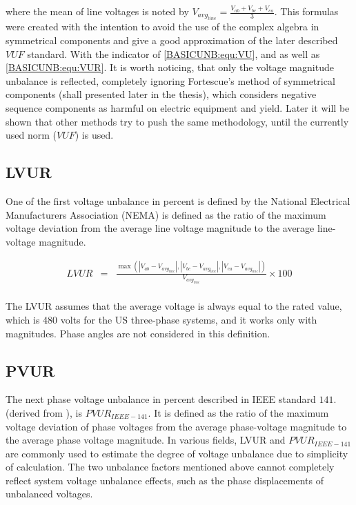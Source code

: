 		where the mean of line voltages is noted by $V_{avg_{line}}=\frac{V_{ab}+V_{bc}+V_{ca}}{3}$.
		This formulas were created with the intention to avoid the use of the complex algebra in symmetrical components and give
a good approximation of the later described $VUF$ standard. With the indicator of \ref{BASICUNB:equ:VU}, and as well as \ref{BASICUNB:equ:VUR}. It is worth noticing, that only the voltage magnitude unbalance is reflected, completely ignoring Fortescue's method of symmetrical components \cite{fortescue1918method} (shall presented later in the thesis), which considers negative sequence components as harmful on electric equipment and yield. Later it will be shown that other methods try to push the same methodology, until the currently used norm ($VUF$) is used.

	
	\subsection{LVUR}\label{BASICUNB:sec:LVUR}
	
	One of the first voltage unbalance in percent is defined by the National Electrical Manufacturers Association (NEMA) \cite{bonnett1997understanding} is defined  as the ratio of the maximum voltage deviation from the average line voltage magnitude to the average line-voltage magnitude.
	
\begin{equation}
        \begin{array}{rcl}
            LVUR&=&\frac{\max\left( |V_{ab}-V_{avg_{line}}|,|V_{bc}-V_{avg_{line}}|,|V_{ca}-V_{avg_{line}}| \right)}{V_{avg_{line}}}\times100\\			
        \end{array}
        \label{BASICUNB:equ:LVUR}
    \end{equation}
		
		The LVUR assumes that the average voltage is always equal to the rated value, which is 480 volts for the US three-phase systems, and it works only with magnitudes. Phase angles are not considered in this definition.
	
	\subsection{PVUR}\label{BASICUNB:sec:PVUR}
	
	The next phase voltage unbalance in percent described in IEEE standard $141.$ \cite{IEEE_141_35071} (derived from \cite{IEEE_112_8635630}), is $PVUR_{IEEE-141}$. It is defined as the ratio of the maximum voltage deviation of phase voltages from the average phase-voltage magnitude to the average phase voltage magnitude. In various fields, LVUR and $PVUR_{IEEE-141}$ are commonly used to estimate the degree of voltage unbalance due to simplicity of calculation. The two unbalance factors mentioned above cannot completely reflect system voltage unbalance effects, such as the phase displacements of unbalanced voltages.
	
